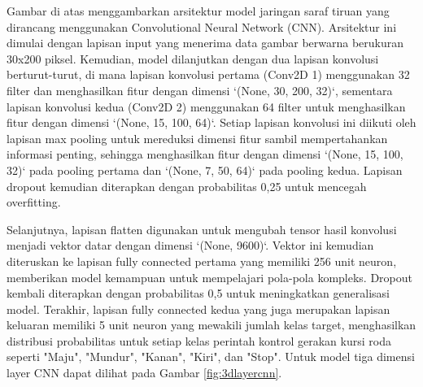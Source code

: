 Gambar di atas menggambarkan arsitektur model jaringan saraf tiruan yang dirancang menggunakan Convolutional Neural Network (CNN). Arsitektur ini dimulai dengan lapisan input yang menerima data gambar berwarna berukuran 30x200 piksel. Kemudian, model dilanjutkan dengan dua lapisan konvolusi berturut-turut, di mana lapisan konvolusi pertama (Conv2D 1) menggunakan 32 filter dan menghasilkan fitur dengan dimensi `(None, 30, 200, 32)`, sementara lapisan konvolusi kedua (Conv2D 2) menggunakan 64 filter untuk menghasilkan fitur dengan dimensi `(None, 15, 100, 64)`. Setiap lapisan konvolusi ini diikuti oleh lapisan max pooling untuk mereduksi dimensi fitur sambil mempertahankan informasi penting, sehingga menghasilkan fitur dengan dimensi `(None, 15, 100, 32)` pada pooling pertama dan `(None, 7, 50, 64)` pada pooling kedua. Lapisan dropout kemudian diterapkan dengan probabilitas 0,25 untuk mencegah overfitting.

Selanjutnya, lapisan flatten digunakan untuk mengubah tensor hasil konvolusi menjadi vektor datar dengan dimensi `(None, 9600)`. Vektor ini kemudian diteruskan ke lapisan fully connected pertama yang memiliki 256 unit neuron, memberikan model kemampuan untuk mempelajari pola-pola kompleks. Dropout kembali diterapkan dengan probabilitas 0,5 untuk meningkatkan generalisasi model. Terakhir, lapisan fully connected kedua yang juga merupakan lapisan keluaran memiliki 5 unit neuron yang mewakili jumlah kelas target, menghasilkan distribusi probabilitas untuk setiap kelas perintah kontrol gerakan kursi roda seperti "Maju", "Mundur", "Kanan", "Kiri", dan "Stop". Untuk model tiga dimensi layer CNN dapat dilihat pada Gambar \ref{fig:3dlayercnn}.

